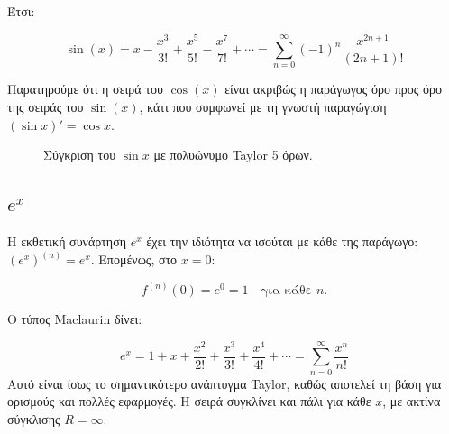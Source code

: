 \documentclass[a4paper, 11pt]{article}
\begin{document}
Έτσι:

\[
\sin(x) = x - \frac{x^3}{3!} + \frac{x^5}{5!} - \frac{x^7}{7!} + \cdots = \sum_{n=0}^{\infty} (-1)^n \frac{x^{2n+1}}{(2n+1)!}
\]

Παρατηρούμε ότι η σειρά του \(\cos(x)\) είναι ακριβώς η παράγωγος όρο
προς όρο της σειράς του \(\sin(x)\), κάτι που συμφωνεί με τη γνωστή
παραγώγιση \((\sin x)' = \cos x\).

\begin{figure}[htbp]
\centering
{}
\caption{Σύγκριση του $\sin x$ με πολυώνυμο Taylor 5 όρων.}
\label{fig:sintaylor}
\par
\end{figure}

\subsection{\texorpdfstring{\(e^x\)}{e\^{}x}}\label{ex}

Η εκθετική συνάρτηση \(e^x\) έχει την ιδιότητα να ισούται με κάθε της
παράγωγο: \((e^x)^{(n)} = e^x\). Επομένως, στο \(x=0\):

\[
f^{(n)}(0) = e^0 = 1 \quad \text{για κάθε } n.
\]

Ο τύπος Maclaurin δίνει:

\[
e^x = 1 + x + \frac{x^2}{2!} + \frac{x^3}{3!} + \frac{x^4}{4!} + \cdots = \sum_{n=0}^{\infty} \frac{x^n}{n!}
\] Αυτό είναι ίσως το σημαντικότερο ανάπτυγμα Taylor, καθώς αποτελεί τη
βάση για ορισμούς και πολλές εφαρμογές. Η σειρά συγκλίνει και πάλι για
κάθε \(x\), με ακτίνα σύγκλισης \(R=\infty\).
\end{document}
